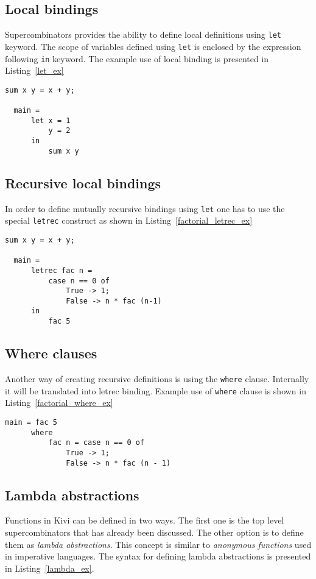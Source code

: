 \documentclass[a4paper]{report}
\begin{document}
\subsection{Local bindings}
Supercombinators provides the ability to define local definitions using
\texttt{let} keyword. The scope of variables defined using \texttt{let} is
enclosed by the expression following \texttt{in} keyword. The example use of
local binding is presented in Listing~\ref{let_ex}


\begin{lstlisting}[label=let_ex,caption={Local \texttt{let} binding.}]
  sum x y = x + y;

  main =
      let x = 1
          y = 2
      in
          sum x y
\end{lstlisting}

\subsection{Recursive local bindings}
In order to define mutually recursive bindings using \texttt{let} one has to use the
special \texttt{letrec} construct as shown in Listing~\ref{factorial_letrec_ex}


\begin{lstlisting}[label=factorial_letrec_ex,caption={Factorial function using \texttt{letrec}.}]
  sum x y = x + y;

  main =
      letrec fac n =
          case n == 0 of
              True -> 1;
              False -> n * fac (n-1)
      in
          fac 5
\end{lstlisting}

\subsection{Where clauses}
Another way of creating recursive definitions is using the \texttt{where}
clause. Internally it will be translated into letrec binding. Example use of
\texttt{where} clause is shown in Listing~\ref{factorial_where_ex}

\begin{lstlisting}[label=factorial_where_ex,caption={Factorial function using \texttt{where}.}]
  main = fac 5
      where
          fac n = case n == 0 of
              True -> 1;
              False -> n * fac (n - 1)
\end{lstlisting}

\subsection{Lambda abstractions}
Functions in Kivi can be defined in two ways. The first one is the top level
supercombinators that has already been discussed. The other option is to define
them as \textit{lambda abstractions}. This concept is similar to \textit{anonymous
functions} used in imperative languages. The syntax for defining lambda
abstractions is presented in Listing~\ref{lambda_ex}.
\end{document}
